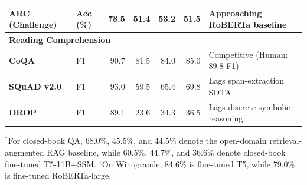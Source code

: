 \documentclass[../../../main.tex]{subfiles}
\begin{document}
\begin{table}[t]
\begin{tabularx}{\textwidth}{l l r r r r X}
\textbf{ARC (Challenge)} & Acc (\%) & 78.5 & 51.4 & 53.2 & 51.5 & Approaching RoBERTa baseline \\
\midrule
\multicolumn{7}{l}{\textbf{Reading Comprehension}} \\
\textbf{CoQA} & F1 & 90.7 & 81.5 & 84.0 & 85.0 & Competitive (Human: 89.8 F1) \\
\textbf{SQuAD v2.0} & F1 & 93.0 & 59.5 & 65.4 & 69.8 & Lags span-extraction SOTA \\
\textbf{DROP} & F1 & 89.1 & 23.6 & 34.3 & 36.5 & Lags discrete symbolic reasoning \\
\bottomrule
\end{tabularx}
\begin{flushleft}
\footnotesize $^*$For closed-book QA, 68.0\%, 45.5\%, and 44.5\% denote the open-domain retrieval-augmented RAG baseline, while 60.5\%, 44.7\%, and 36.6\% denote closed-book fine-tuned T5-11B+SSM. $^\dagger$On Winogrande, 84.6\% is fine-tuned T5, while 79.0\% is fine-tuned RoBERTa-large.
\end{flushleft}
\end{table}
\end{document}
